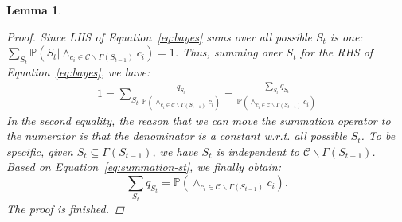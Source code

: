\documentclass[letterpaper]{article} %
\newtheorem{lemma}{Lemma}
\newcommand{\p}{\mathbb{P}}
\begin{document}
\begin{lemma}
\begin{proof}
Since LHS of Equation~\eqref{eq:bayes} sums over all possible $S_t$ is one: $\sum_{S_t}\p(S_t |\wedge_{c_i \in \mathcal{C}\backslash \Gamma(S_{t-1})}c_i)=1$. Thus, summing over $S_t$ for the RHS of Equation~\eqref{eq:bayes}, we have:
\begin{equation} \label{eq:summation-st} 
\begin{aligned}
1=\sum_{S_t}\frac{q_{S_t} }{\p \left(\wedge_{c_i \in \mathcal{C}\backslash \Gamma(S_{t-1})}c_i\right) }=\frac{\sum_{S_t}q_{S_t} }{\p \left(\wedge_{c_i \in \mathcal{C}\backslash \Gamma(S_{t-1})}c_i\right) }
\end{aligned}
\end{equation}
In the second equality, the reason that we can move the summation operator to  the numerator is that the denominator is a constant \textit{w.r.t.} all possible $S_t$. To be specific, given $S_t\subseteq\Gamma(S_{t-1})$, we have  $S_t$ is independent to $\mathcal{C}\backslash \Gamma(S_{t-1})$.
Based on Equation~\eqref{eq:summation-st}, we finally obtain:
\begin{equation*}
\sum_{S_t}q_{S_t}=\p(\wedge_{c_i \in \mathcal{C}\backslash \Gamma(S_{t-1})}c_i).
\end{equation*}
The proof  is finished. 
\end{proof}
\end{lemma}
\end{document}
